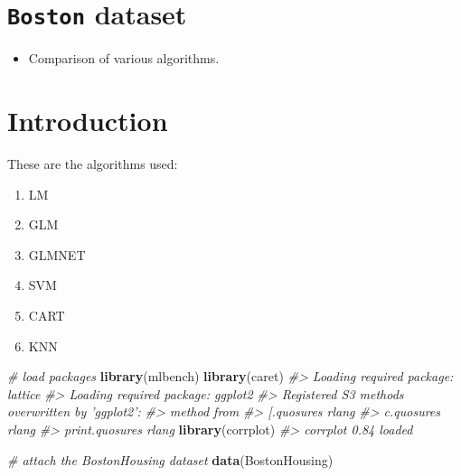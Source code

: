\documentclass[]{book}
\newenvironment{Shaded}{\begin{snugshade}}{\end{snugshade}}
\newcommand{\CommentTok}[1]{\textcolor[rgb]{0.56,0.35,0.01}{\textit{#1}}}
\newcommand{\KeywordTok}[1]{\textcolor[rgb]{0.13,0.29,0.53}{\textbf{#1}}}
\newcommand{\NormalTok}[1]{#1}
\providecommand{\tightlist}{%
  \setlength{\itemsep}{0pt}\setlength{\parskip}{0pt}}
\begin{document}
\hypertarget{boston-dataset}{%
\section{\texorpdfstring{\texttt{Boston} dataset}{Boston dataset}}\label{boston-dataset}}

\begin{itemize}
\tightlist
\item
  Comparison of various algorithms.
\end{itemize}

\hypertarget{introduction-3}{%
\section{Introduction}\label{introduction-3}}

These are the algorithms used:

\begin{enumerate}
\def\labelenumi{\arabic{enumi}.}
\tightlist
\item
  LM
\item
  GLM
\item
  GLMNET
\item
  SVM
\item
  CART
\item
  KNN
\end{enumerate}

\begin{Shaded}
\begin{Highlighting}[]
\CommentTok{# load packages}
\KeywordTok{library}\NormalTok{(mlbench)}
\KeywordTok{library}\NormalTok{(caret)}
\CommentTok{#> Loading required package: lattice}
\CommentTok{#> Loading required package: ggplot2}
\CommentTok{#> Registered S3 methods overwritten by 'ggplot2':}
\CommentTok{#>   method         from }
\CommentTok{#>   [.quosures     rlang}
\CommentTok{#>   c.quosures     rlang}
\CommentTok{#>   print.quosures rlang}
\KeywordTok{library}\NormalTok{(corrplot)}
\CommentTok{#> corrplot 0.84 loaded}

\CommentTok{# attach the BostonHousing dataset}
\KeywordTok{data}\NormalTok{(BostonHousing)}
\end{Highlighting}
\end{Shaded}
\end{document}
